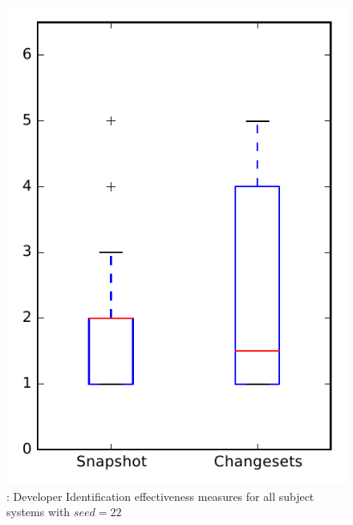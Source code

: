 
\begin{figure}
\centering
\includegraphics[height=0.4\textheight]{figures/dit_seed/rq1_overview_22}
\caption{\rtwo: Developer Identification effectiveness measures for all subject systems with $seed=22$}
\label{fig:dit_seed:rq1:overview}
\end{figure}
